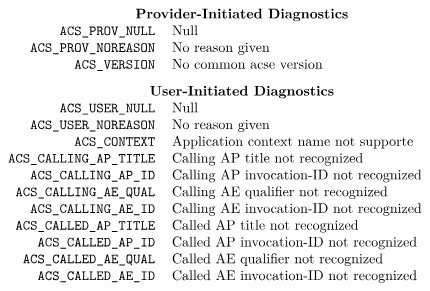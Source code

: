 
\normalsize
\[\begin{tabular}{rp{3.0in}}
    \multicolumn{2}{c}{\bf Provider-Initiated Diagnostics}\\
\tt ACS\_PROV\_NULL&		Null\\
\tt ACS\_PROV\_NOREASON&	No reason given\\
\tt ACS\_VERSION&		No common acse version\\[0.1in]
    \multicolumn{2}{c}{\bf User-Initiated Diagnostics}\\
\tt ACS\_USER\_NULL&		Null\\
\tt ACS\_USER\_NOREASON&	No reason given\\
\tt ACS\_CONTEXT&		Application context name not supporte\\
\tt ACS\_CALLING\_AP\_TITLE&	Calling AP title not recognized\\
\tt ACS\_CALLING\_AP\_ID&	Calling AP invocation-ID not recognized\\
\tt ACS\_CALLING\_AE\_QUAL&	Calling AE qualifier not recognized\\
\tt ACS\_CALLING\_AE\_ID&	Calling AE invocation-ID not recognized\\
\tt ACS\_CALLED\_AP\_TITLE&	Called AP title not recognized\\
\tt ACS\_CALLED\_AP\_ID&	Called AP invocation-ID not recognized\\
\tt ACS\_CALLED\_AE\_QUAL&	Called AE qualifier not recognized\\
\tt ACS\_CALLED\_AE\_ID&	Called AE invocation-ID not recognized
\end{tabular}\]
